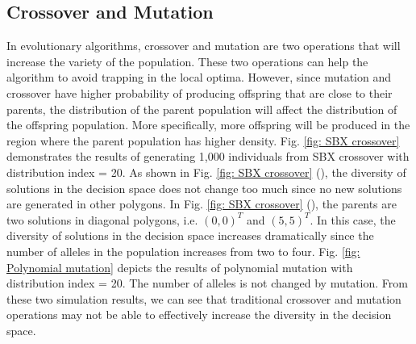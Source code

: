 \documentclass[conference]{IEEEtran}
\begin{document}
\subsection{Crossover and Mutation}
In evolutionary algorithms, crossover and mutation are two operations that will increase the variety of the population. These two operations can help the algorithm to avoid trapping in the local optima. However, since mutation and crossover have higher probability of producing offspring that are close to their parents, the distribution of the parent population will affect the distribution of the offspring population. More specifically, more offspring will be produced in the region where the parent population has higher density. Fig. \ref{fig: SBX crossover} demonstrates the results of generating 1,000 individuals from SBX\cite{deb1995simulated} crossover with distribution index = 20. As shown in Fig. \ref{fig: SBX crossover} (), the diversity of solutions in the decision space does not change too much since no new solutions are generated in other polygons. In Fig. \ref{fig: SBX crossover} (), the parents are two solutions in diagonal polygons, i.e. $(0, 0)^T$ and $(5, 5)^T$. In this case, the diversity of solutions in the decision space increases dramatically since the number of alleles in the population increases from two to four. Fig. \ref{fig: Polynomial mutation} depicts the results of polynomial mutation with distribution index = 20. The number of alleles is not changed by mutation. From these two simulation results, we can see that traditional crossover and mutation operations may not be able to effectively increase the diversity in the decision space.
\end{document}

